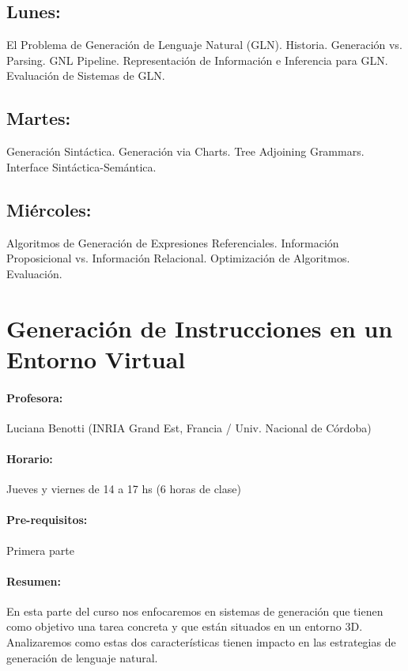 \documentclass[a4paper]{article}
\begin{document}
\subsection*{Lunes:} El Problema de Generaci\'on de Lenguaje Natural (GLN). Historia. Generaci\'on vs. Parsing. GNL Pipeline. Representaci\'on de Informaci\'on e Inferencia para GLN. Evaluaci\'on de Sistemas de GLN.

\subsection*{Martes:} Generaci\'on Sint\'actica. Generaci\'on via Charts. Tree Adjoining Grammars. Interface Sint\'actica-Sem\'antica.

\subsection*{Mi\'ercoles:} Algoritmos de Generaci\'on de Expresiones Referenciales. Informaci\'on Proposicional vs. Informaci\'on Relacional. Optimizaci\'on de Algoritmos. Evaluaci\'on.


\section{Generaci\'on de Instrucciones en un Entorno Virtual}

\paragraph{Profesora:} Luciana Benotti (INRIA Grand Est, Francia / Univ. Nacional de C\'ordoba)

\paragraph{Horario:} Jueves y viernes de 14 a 17 hs (6 horas de clase)

\paragraph{Pre-requisitos:} Primera parte

\paragraph{Resumen:} En esta parte del curso nos enfocaremos en sistemas de generaci\'on que tienen como objetivo una tarea concreta y que est\'an situados en un entorno 3D. Analizaremos como estas dos caracter\'isticas tienen impacto en las estrategias de generaci\'on de lenguaje natural.
\end{document}
